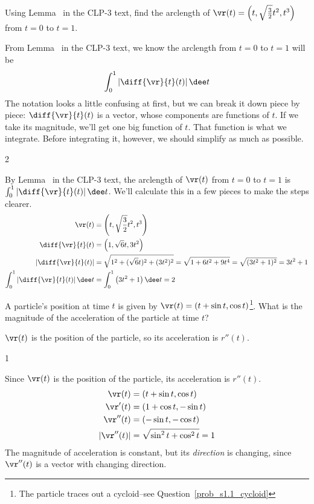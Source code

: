 \begin{question}\label{prob_s1.1:lemma113}
Using Lemma~ in the CLP-3 text, find the arclength of $\vr(t)=\left(t,\sqrt{\frac{3}{2}}t^2,t^3\right)$ from $t=0$ to $t=1$.
\end{question}
\begin{hint}
From Lemma~ in the CLP-3 text, 
we know the arclength from $t=0$ to $t=1$ will be
\[\int_{0}^1\left| \diff{\vr}{t}(t)\right|\dee t\]
The notation looks a little confusing at first, but we can break it down piece by piece: $\diff{\vr}{t}(t)$ is a vector, whose components are functions of $t$. If we take its magnitude, we'll get one big function of $t$. That function is what we integrate. Before integrating it, however, we should simplify as much as possible.
\end{hint}
\begin{answer}
2
\end{answer}
\begin{solution}
By Lemma~ in the CLP-3 text,  
the arclength of $\vr(t)$ from $t=0$ to $t=1$ is
$\int_{0}^1\left| \diff{\vr}{t}(t)\right|\dee t$. We'll calculate this in a few pieces to make the steps clearer.
\begin{align*}
\vr(t)&=\left(t,\sqrt{\frac{3}{2}}t^2,t^3\right)\\
\diff{\vr}{t}(t)&=\left(1,\sqrt{6}t,3t^2\right)\\
\left|\diff{\vr}{t}(t)\right|&=\sqrt{1^2+(\sqrt{6}t)^2+(3t^2)^2}=\sqrt{1+6t^2+9t^4}=\sqrt{(3t^2+1)^2}=3t^2+1\\
\int_{0}^1\left| \diff{\vr}{t}(t)\right|\dee t&=\int_0^1\left(3t^2+1 \right)\dee t=2
\end{align*}
\end{solution}

\begin{question}
A particle's position at time $t$ is given by $\vr(t)=(t+\sin t, \cos t)$\footnote{The particle traces out a cycloid--see Question~\ref{prob_s1.1_cycloid}}. What is the magnitude of the acceleration of the particle at time $t$?
\end{question}
\begin{hint}
$\vr(t)$ is the position of the particle, so its acceleration is $r''(t)$.
\end{hint}
\begin{answer}
1
\end{answer}
\begin{solution}
Since $\vr(t)$ is the position of the particle,  its acceleration is $r''(t)$.
\begin{align*}
\vr(t)&=(t+\sin t, \cos t)\\
\vr'(t)&=(1+\cos t,-\sin t)\\
\vr''(t)&=(-\sin t,-\cos t)\\
|\vr''(t)|&=\sqrt{\sin^2t+\cos^2t}=1
\end{align*}
The magnitude of acceleration is constant, but its \emph{direction} is changing, since $\vr''(t)$ is a vector with changing direction.
\end{solution}



